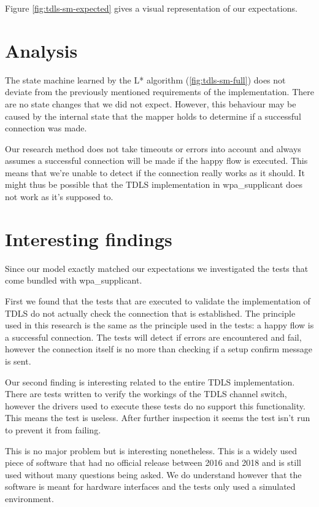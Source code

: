 Figure \ref{fig:tdls-sm-expected} gives a visual representation of our expectations.

\section{Analysis}

The state machine learned by the L* algorithm (\ref{fig:tdls-sm-full}) does not deviate from the previously mentioned requirements of the implementation. There are no state changes that we did not expect. However, this behaviour may be caused by the internal state that the mapper holds to determine if a successful connection was made.

Our research method does not take timeouts or errors into account and always assumes a successful connection will be made if the happy flow is executed. This means that we're unable to detect if the connection really works as it should. It might thus be possible that the TDLS implementation in wpa\_supplicant does not work as it's supposed to.

\section{Interesting findings}

Since our model exactly matched our expectations we investigated the tests that come bundled with wpa\_supplicant.

First we found that the tests that are executed to validate the implementation of TDLS do not actually check the connection that is established. The principle used in this research is the same as the principle used in the tests: a happy flow is a successful connection. The tests will detect if errors are encountered and fail, however the connection itself is no more than checking if a setup confirm message is sent.

Our second finding is interesting related to the entire TDLS implementation. There are tests written to verify the workings of the TDLS channel switch, however the drivers used to execute these tests do no support this functionality. This means the test is useless. After further inspection it seems the test isn't run to prevent it from failing.

This is no major problem but is interesting nonetheless. This is a widely used piece of software that had no official release between 2016 and 2018 and is still used without many questions being asked. We do understand however that the software is meant for hardware interfaces and the tests only used a simulated environment.
